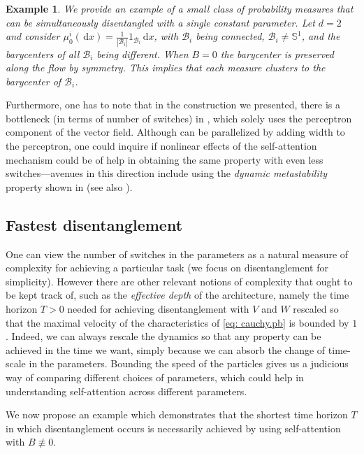 \documentclass[a4paper,11pt]{article}
\theoremstyle{plain}
\newtheorem{example}[theorem]{Example}
\newcommand{\diff}{\, \mathrm{d}}
\newcommand{\bW}{\bm{\mathit{W}}}
\newcommand{\bV}{\bm{\mathit{V}}}
\newcommand{\bB}{\bm{\mathit{B}}}
\numberwithin{equation}{section}
\begin{document}
\begin{example}
We provide an example of a small class of probability measures that can be simultaneously disentangled with a single constant parameter. Let $d=2$ and consider $\mu_0^i(\diff x)=\frac{1}{|\mathscr{B}_i|}1_{\mathscr{B}_i}\diff x$, with $\mathscr{B}_i$ being connected, $\mathscr{B}_i\neq \mathbb{S}^1$, and the barycenters of all $\mathscr{B}_i$ being different. When $\bB=0$ the barycenter is preserved along the flow by symmetry. This implies that each measure clusters to the barycenter of $\mathscr{B}_i$.
\end{example}



Furthermore, one has to note that in the construction we presented, there is a bottleneck (in terms of number of switches) in , which solely uses the perceptron component of the vector field. Although  can be parallelized by adding width to the perceptron, one could inquire if nonlinear effects of the self-attention mechanism could be of help in obtaining the same property with even less switches---avenues in this direction include using the \emph{dynamic metastability} property shown in \cite{geshkovski2024dynamic} (see also \cite{bruno2024emergence}).

\subsection{Fastest disentanglement}

One can view the number of switches in the parameters as a natural measure of complexity for achieving a particular task (we focus on disentanglement for simplicity). However there are other relevant notions of complexity that ought to be kept track of, such as the \emph{effective depth} of the architecture, namely the time horizon $T>0$ needed for achieving disentanglement with $\bV$ and $\bW$ rescaled so that the maximal velocity of the characteristics of \eqref{eq: cauchy.pb} is bounded by $1$.
Indeed, we can always rescale the dynamics so that any property can be achieved in the time we want, simply because we can absorb the change of time-scale in the parameters. Bounding the speed of the particles gives us a judicious way of comparing different choices of parameters, which could help in understanding self-attention across different parameters.

We now propose an example which demonstrates that the shortest time horizon $T$ in which disentanglement occurs is necessarily achieved by using self-attention with $\bB\not\equiv0$. 
\end{document}

